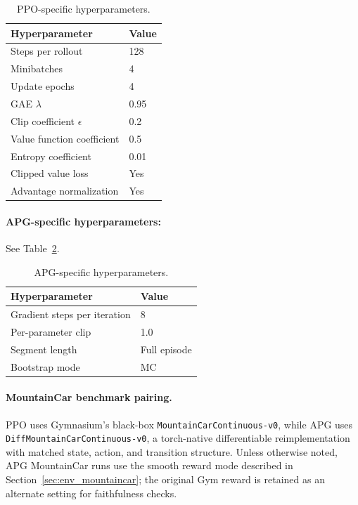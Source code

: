 \documentclass[11pt,a4paper]{article}
\begin{document}
\begin{table}[htbp]
  \centering
  \caption{PPO-specific hyperparameters.}
  \label{tab:ppo_hp}
  \begin{tabular}{@{}ll@{}}
    \toprule
    \textbf{Hyperparameter} & \textbf{Value} \\
    \midrule
    Steps per rollout           & 128 \\
    Minibatches                 & 4 \\
    Update epochs               & 4 \\
    GAE $\lambda$               & 0.95 \\
    Clip coefficient $\epsilon$ & 0.2 \\
    Value function coefficient  & 0.5 \\
    Entropy coefficient         & 0.01 \\
    Clipped value loss          & Yes \\
    Advantage normalization     & Yes \\
    \bottomrule
  \end{tabular}
\end{table}

\paragraph{APG-specific hyperparameters:} See Table~\ref{tab:apg_hp}.

\begin{table}[htbp]
  \centering
  \caption{APG-specific hyperparameters.}
  \label{tab:apg_hp}
  \begin{tabular}{@{}ll@{}}
    \toprule
    \textbf{Hyperparameter} & \textbf{Value} \\
    \midrule
    Gradient steps per iteration   & 8 \\
    Per-parameter clip             & 1.0 \\
    Segment length                 & Full episode \\
    Bootstrap mode                 & MC \\
    \bottomrule
  \end{tabular}
\end{table}

\paragraph{MountainCar benchmark pairing.} PPO uses Gymnasium's black-box \texttt{MountainCarContinuous-v0}, while APG uses \texttt{DiffMountainCarContinuous-v0}, a torch-native differentiable reimplementation with matched state, action, and transition structure. Unless otherwise noted, APG MountainCar runs use the smooth reward mode described in Section~\ref{sec:env_mountaincar}; the original Gym reward is retained as an alternate setting for faithfulness checks.
\end{document}
